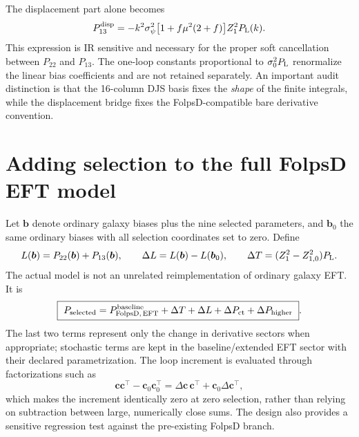 \documentclass[11pt,a4paper]{article}
\newcommand{\Pl}{P_{\rm L}}
\begin{document}
The displacement part alone becomes
\begin{equation}\label{eq:displacement}
 P_{13}^{\rm disp}=-k^2\sigma_\psi^2\big[1+f\mu^2(2+f)\big]Z_1^2\Pl(k).
\end{equation}
This expression is IR sensitive and necessary for the proper soft cancellation between $P_{22}$ and $P_{13}$. The one-loop constants proportional to $\sigma_0^2\Pl$ renormalize the linear bias coefficients and are not retained separately. An important audit distinction is that the 16-column DJS basis fixes the \emph{shape} of the finite integrals, while the displacement bridge fixes the FolpsD-compatible bare derivative convention.

\section{Adding selection to the full FolpsD EFT model}\label{sec:assembly}
Let $\bm b$ denote ordinary galaxy biases plus the nine selected parameters, and $\bm b_0$ the same ordinary biases with all selection coordinates set to zero. Define
\begin{equation}
 L(\bm b)=P_{22}(\bm b)+P_{13}(\bm b),\qquad
 \Delta L=L(\bm b)-L(\bm b_0),\qquad
 \Delta T=(Z_1^2-Z_{1,0}^2)\Pl.
\end{equation}
The actual model is not an unrelated reimplementation of ordinary galaxy EFT. It is
\begin{equation}\label{eq:assembly}
 \boxed{\ P_{\rm selected}=P_{\rm FolpsD,\,EFT}^{\rm baseline}+\Delta T+\Delta L
 +\Delta P_{\rm ct}+\Delta P_{\rm higher}\ }.
\end{equation}
The last two terms represent only the change in derivative sectors when appropriate; stochastic terms are kept in the baseline/extended EFT sector with their declared parametrization. The loop increment is evaluated through factorizations such as
\begin{equation}
 \bm c\bm c^\intercal-\bm c_0\bm c_0^\intercal
 =\Delta\bm c\,\bm c^\intercal+\bm c_0\Delta\bm c^\intercal,
\end{equation}
which makes the increment identically zero at zero selection, rather than relying on subtraction between large, numerically close sums. The design also provides a sensitive regression test against the pre-existing FolpsD branch.
\end{document}
